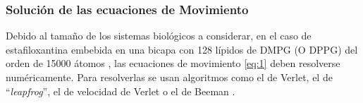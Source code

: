 \documentclass[12pt]{article}
\begin{document}

\subsubsection{Solución de las ecuaciones de Movimiento}
Debido al tamaño de los sistemas biológicos a considerar, en el caso de estafiloxantina embebida en una bicapa con 128 lípidos de DMPG (O DPPG) del orden de 15000 átomos \cite{MelendezDelgado2018StudyingBilayers}, las ecuaciones de movimiento \eqref{eq:1} deben resolverse numéricamente. Para resolverlas se usan algoritmos como el de Verlet, el de ``\textit{leapfrog}'', el de velocidad de Verlet o el de Beeman \cite{Mazur1997CommonRevisited}.\\
\end{document}
